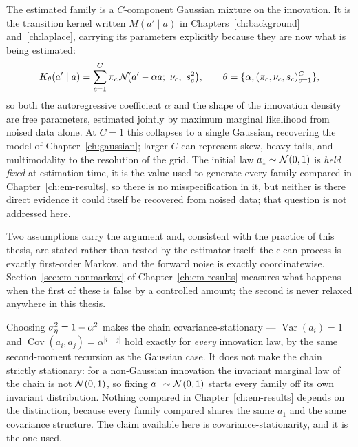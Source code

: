 The estimated family is a $C$-component Gaussian mixture on the innovation.
It is the transition kernel written $M(a' \mid a)$ in
Chapters~\ref{ch:background} and~\ref{ch:laplace}, carrying its parameters
explicitly because they are now what is being estimated:
\begin{equation}
  K_\theta(a' \mid a) = \sum_{c=1}^{C} \pi_c \,
    \mathcal{N}\!\big(a' - \alpha a;\ \nu_c,\ s_c^2\big),
  \qquad \theta = \{\alpha, (\pi_c,\nu_c,s_c)_{c=1}^C\},
  \label{eq:em-mixture-kernel}
\end{equation}
so both the autoregressive coefficient $\alpha$ and the shape of the
innovation density are free parameters, estimated jointly by maximum marginal
likelihood from noised data alone. At $C=1$ this collapses to a single
Gaussian, recovering the model of Chapter~\ref{ch:gaussian}; larger $C$ can
represent skew, heavy tails, and multimodality to the resolution of the
grid. The initial law $a_1 \sim \mathcal{N}(0,1)$ is \emph{held fixed} at
estimation time, it is the value used to generate every family compared in
Chapter~\ref{ch:em-results}, so there is no misspecification in it, but
neither is there direct evidence it could itself be recovered from noised
data; that question is not addressed here.

Two assumptions carry the argument and, consistent with the practice of this
thesis, are stated rather than tested by the estimator itself: the clean
process is exactly first-order Markov, and the forward noise is exactly
coordinatewise. Section~\ref{sec:em-nonmarkov} of Chapter~\ref{ch:em-results} measures
what happens when the first of these is false by a controlled amount; the
second is never relaxed anywhere in this thesis.

\begin{remark}
Choosing $\sigma_\eta^2=1-\alpha^2$ makes the chain covariance-stationary --- $\operatorname{Var}(a_i)=1$
and $\operatorname{Cov}(a_i,a_j)=\alpha^{|i-j|}$ hold exactly for \emph{every} innovation
law, by the same second-moment recursion as the Gaussian case. It does not
make the chain strictly stationary: for a non-Gaussian innovation the
invariant marginal law of the chain is not $\mathcal{N}(0,1)$, so fixing $a_1\sim
\mathcal{N}(0,1)$ starts every family off its own invariant distribution. Nothing
compared in Chapter~\ref{ch:em-results} depends on the distinction, because every
family compared shares the same $a_1$ and the same covariance structure. The
claim available here is covariance-stationarity, and it is the one used.
\end{remark}

